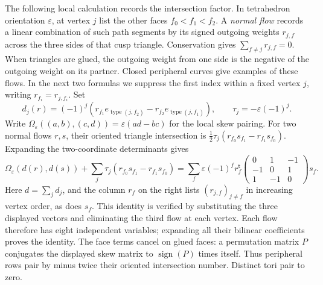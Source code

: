 \documentclass[11pt]{article}
\numberwithin{equation}{section}
\theoremstyle{definition}
\theoremstyle{remark}
\begin{document}
The following local calculation records the intersection factor.
In tetrahedron orientation \(\varepsilon\),
at vertex \(j\) list the other faces \(f_0<f_1<f_2\).
A \emph{normal flow} records a linear combination of such path
segments by its signed outgoing weights \(r_{j,f}\) across the
three sides of that cusp triangle. Conservation gives
\(\sum_{f\ne j}r_{j,f}=0\). When triangles are glued, the outgoing
weight from one side is the negative of the outgoing weight on its
partner. Closed peripheral curves give examples of these flows.
In the next two formulas we suppress the first index within a fixed
vertex \(j\), writing \(r_{f_i}=r_{j,f_i}\).
Set
\[
 d_j(r)=(-1)^j\!
    \left(r_{f_1}e_{\operatorname{type}(j,f_2)}
              -r_{f_2}e_{\operatorname{type}(j,f_1)}\right),
 \qquad \tau_j=-\varepsilon(-1)^j .
\]
Write \(\Omega_\varepsilon((a,b),(c,d))
=\varepsilon(ad-bc)\) for the local skew pairing. For two normal
flows \(r,s\), their oriented triangle intersection is
\(\frac12\tau_j(r_{f_0}s_{f_1}-r_{f_1}s_{f_0})\).
Expanding the two-coordinate determinants gives
\begin{equation}\label{mf:normal-flow}
 \Omega_\varepsilon(d(r),d(s))
 +\sum_j\tau_j(r_{f_0}s_{f_1}-r_{f_1}s_{f_0})
 =\sum_f\varepsilon(-1)^f r_f^{\mathsf t}
       \begin{pmatrix}0&1&-1\\-1&0&1\\1&-1&0\end{pmatrix}s_f .
\end{equation}
Here \(d=\sum_jd_j\), and the column \(r_f\) on the right lists
\((r_{j,f})_{j\ne f}\) in increasing vertex order, as does \(s_f\).
This identity is verified by substituting the three displayed vectors
and eliminating the third flow at each vertex. Each flow therefore
has eight independent variables; expanding all their bilinear
coefficients proves the identity.
The face terms cancel on glued faces: a permutation matrix \(P\)
conjugates the displayed skew matrix to \(\operatorname{sign}(P)\)
times itself. Thus peripheral rows pair by minus twice their
oriented intersection number. Distinct tori pair to zero.
\end{document}
